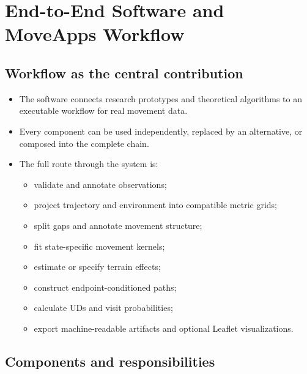 \chapter{End-to-End Software and MoveApps Workflow}
\label{chap:software}

\section{Workflow as the central contribution}

\begin{itemize}
  \item The software connects research prototypes and theoretical algorithms to an executable workflow for real movement data.
  \item Every component can be used independently, replaced by an alternative, or composed into the complete chain.
  \item The full route through the system is:
  \begin{itemize}
    \item validate and annotate observations;
    \item project trajectory and environment into compatible metric grids;
    \item split gaps and annotate movement structure;
    \item fit state-specific movement kernels;
    \item estimate or specify terrain effects;
    \item construct endpoint-conditioned paths;
    \item calculate UDs and visit probabilities;
    \item export machine-readable artifacts and optional Leaflet visualizations.
  \end{itemize}
\end{itemize}

\section{Components and responsibilities}

